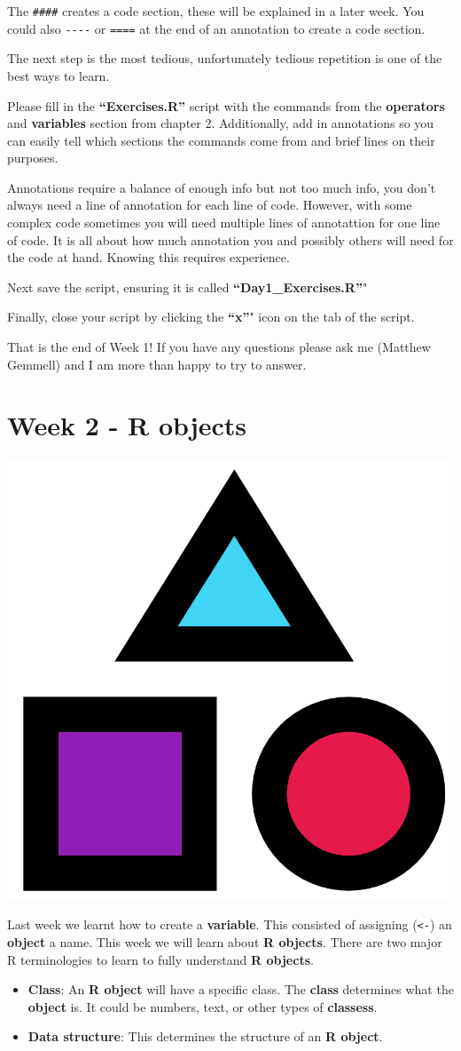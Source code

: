 \documentclass[]{book}
\providecommand{\tightlist}{%
  \setlength{\itemsep}{0pt}\setlength{\parskip}{0pt}}
\begin{document}
The \texttt{\#\#\#\#} creates a code section, these will be explained in
a later week. You could also \texttt{-\/-\/-\/-} or \texttt{====} at the
end of an annotation to create a code section.

The next step is the most tedious, unfortunately tedious repetition is
one of the best ways to learn.

Please fill in the \textbf{``Exercises.R''} script with the commands
from the \textbf{operators} and \textbf{variables} section from chapter
2. Additionally, add in annotations so you can easily tell which
sections the commands come from and brief lines on their purposes.

Annotations require a balance of enough info but not too much info, you
don't always need a line of annotation for each line of code. However,
with some complex code sometimes you will need multiple lines of
annotattion for one line of code. It is all about how much annotation
you and possibly others will need for the code at hand. Knowing this
requires experience.

Next save the script, ensuring it is called
\textbf{``Day1\_Exercises.R''}"

Finally, close your script by clicking the \textbf{``x''}" icon on the
tab of the script.

That is the end of Week 1! If you have any questions please ask me
(Matthew Gemmell) and I am more than happy to try to answer.

\chapter{Week 2 - R objects}\label{week-2---r-objects}

\begin{center}\includegraphics[width=0.2\linewidth]{figures/RObjects} \end{center}

Last week we learnt how to create a \textbf{variable}. This consisted of
assigning (\texttt{\textless{}-}) an \textbf{object} a name. This week
we will learn about \textbf{R objects}. There are two major R
terminologies to learn to fully understand \textbf{R objects}.

\begin{itemize}
\tightlist
\item
  \textbf{Class}: An \textbf{R object} will have a specific class. The
  \textbf{class} determines what the \textbf{object} is. It could be
  numbers, text, or other types of \textbf{classess}.
\item
  \textbf{Data structure}: This determines the structure of an \textbf{R
  object}.
\end{itemize}
\end{document}
